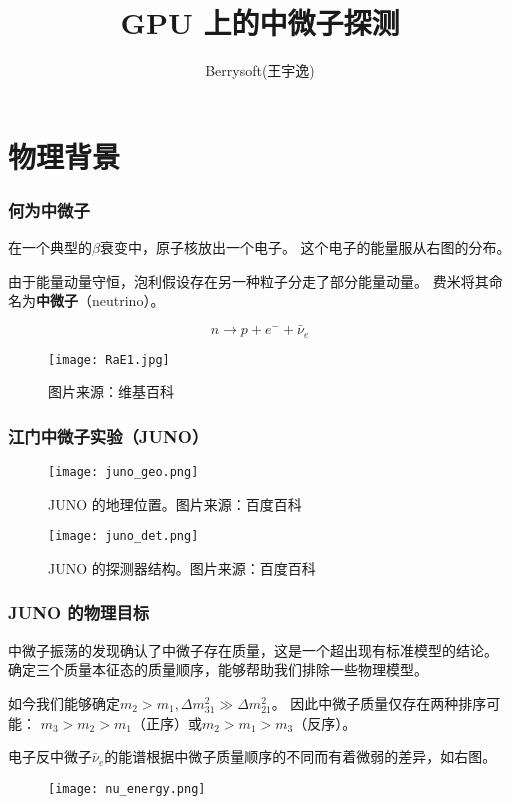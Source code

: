\documentclass[aspectratio=169]{beamer}
\title{GPU 上的中微子探测}
\author{Berrysoft(王宇逸)}
\institute{清华大学工程物理系}
\begin{document}
\begin{frame}
    \titlepage
\end{frame}
\section{物理背景}
\begin{frame}
    \frametitle{何为中微子}

    \begin{multicols}{2}
        在一个典型的$\beta$衰变中，原子核放出一个电子。
        这个电子的能量服从右图的分布。

        由于能量动量守恒，泡利假设存在另一种粒子分走了部分能量动量。
        费米将其命名为\textbf{中微子}（neutrino）。

        \begin{equation*}
            n\to p+e^-+\bar{\nu}_e
        \end{equation*}
        \columnbreak
        \begin{figure}
            \centering
            \texttt{[image: RaE1.jpg]}
            \caption{图片来源：维基百科}
        \end{figure}
    \end{multicols}

\end{frame}

\begin{frame}[allowframebreaks]
    \frametitle{江门中微子实验（JUNO）}

    \begin{figure}
        \centering
        \texttt{[image: juno\_geo.png]}
        \caption{JUNO 的地理位置。图片来源：百度百科}
    \end{figure}

    \begin{figure}
        \centering
        \texttt{[image: juno\_det.png]}
        \caption{JUNO 的探测器结构。图片来源：百度百科}
    \end{figure}

\end{frame}

\begin{frame}
    \frametitle{JUNO 的物理目标}

    \begin{multicols}{2}
        中微子振荡的发现确认了中微子存在质量，这是一个超出现有标准模型的结论。
        确定三个质量本征态的质量顺序，能够帮助我们排除一些物理模型。

        如今我们能够确定$m_2>m_1,\Delta m_{31}^2 \gg \Delta m_{21}^2$。
        因此中微子质量仅存在两种排序可能：
        $m_3>m_2>m_1$（正序）或$m_2>m_1>m_3$（反序）。

        电子反中微子$\bar{\nu}_e$的能谱根据中微子质量顺序的不同而有着微弱的差异，如右图。
        \columnbreak
        \begin{figure}
            \centering
            \texttt{[image: nu\_energy.png]}
        \end{figure}
    \end{multicols}

\end{frame}
\end{document}
